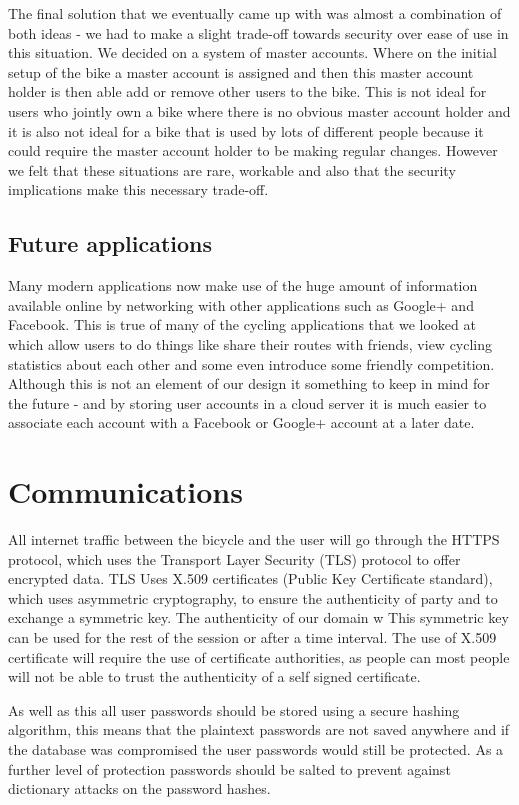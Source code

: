\documentclass[a4paper]{report}
\begin{document}
The final solution that we eventually came up with was almost a combination of both ideas - we had to make a slight trade-off towards security over ease of use in this situation. We decided on a system of master accounts. Where on the initial setup of the bike a master account is assigned and then this master account holder is then able add or remove other users to the bike. This is not ideal for users who jointly own a bike where there is no obvious master account holder and it is also not ideal for a bike that is used by lots of different people because it could require the master account holder to be making regular changes. However we felt that these situations are rare, workable and also that the security implications make this necessary trade-off. 

\subsection{Future applications}
Many modern applications now make use of the huge amount of information available online by networking with other applications such as Google+ and Facebook. This is true of many of the cycling applications that we looked at which allow users to do things like share their routes with friends, view cycling statistics about each other and some even introduce some friendly competition. Although this is not an element of our design it something to keep in mind for the future - and by storing user accounts in a cloud server it is much easier to associate each account with a Facebook or Google+ account at a later date.

\section{Communications}
All internet traffic between the bicycle and the user will go through the HTTPS protocol, which uses the Transport Layer Security (TLS) protocol to offer encrypted data. TLS Uses X.509 certificates (Public Key Certificate standard), which uses asymmetric cryptography, to ensure the authenticity of party and to exchange a symmetric key. The authenticity of our domain w This symmetric key can be used for the rest of the session or after a time interval. The use of X.509 certificate will require the use of  certificate authorities, as people can most people will not be able to trust the authenticity of a self signed certificate.

As well as this all user passwords should be stored using a secure hashing algorithm, this means that the plaintext passwords are not saved anywhere and if the database was compromised the user passwords would still be protected. As a further level of protection passwords should be salted to prevent against dictionary attacks on the password hashes.
\end{document}
